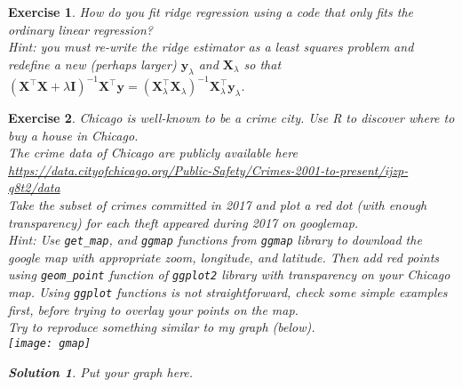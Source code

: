 \documentclass[12pt,a4paper]{article}
\def \y {\mathbf y}
\def \X {\mathbf X}
\def \t {^\top}
\def \inv {^ {-1}}
\newtheorem{exercise}{Exercise}
\numberwithin{exercise}{section} %
\newtheorem{solution}{Solution}
\numberwithin{solution}{section} %
\begin{document}
\begin{exercise}
How do you fit ridge regression using a code that only fits the ordinary linear regression?\\ 
Hint: you must re-write the ridge estimator as a least squares problem and redefine a new (perhaps larger) $\y_\lambda$ and $\X_\lambda$ so that 
$(\X\t\X+\lambda \mathbf I)\inv \X\t \y = (\X_\lambda\t\X_\lambda)\inv \X_\lambda\t \y_\lambda$.
\end{exercise}
\newpage

\begin{exercise}
Chicago is well-known to be a crime city. Use R to discover where  to  buy a house in Chicago.\\ 
The crime data of Chicago are publicly available here \\
{\small
\url{https://data.cityofchicago.org/Public-Safety/Crimes-2001-to-present/ijzp-q8t2/data}} \\
 Take the subset of crimes committed in 2017 and plot a red dot (with enough transparency) for each \emph{theft} appeared during 2017 on googlemap. \\
Hint: Use \texttt{get\_map}, and \texttt{ggmap} functions from 
\texttt{ggmap} library to download the google map with appropriate zoom, longitude, and latitude. 
Then add red points using \texttt{geom\_point} function of \texttt{ggplot2} library with transparency on your Chicago map.  Using \texttt{ggplot} functions is not straightforward, check some simple examples first, before trying to overlay your points on the map.\\
Try to reproduce something similar to my graph (below).\\
\texttt{[image: gmap]}
\begin{solution}
Put your graph here.
\end{solution}
\end{exercise}
\end{document}
